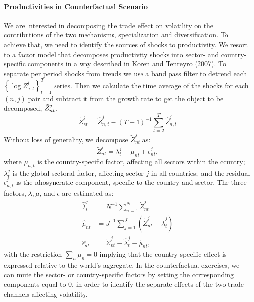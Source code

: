 \documentclass{article}
\begin{document}
\paragraph{Productivities in Counterfactual Scenario}

We are interested in decomposing the trade effect on volatility on the
contributions of the two mechanisms, specialization and diversification. To
achieve that, we need to identify the sources of shocks to productivity. We
resort to a factor model that decomposes productivity shocks into sector-
and country-specific components in a way described in Koren and Tenreyro
(2007). To separate per period shocks from trends we use a band pass filter
to detrend each $\left\{ \log {Z_{n,t}^{j}}\right\} _{t=1}^{T}$ series. Then
we calculate the time average of the shocks for each $(n,j)$ pair and
subtract it from the growth rate to get the object to be decomposed, $\tilde{%
Z}_{nt}^{j}$. 
\begin{equation*}
\tilde{Z}_{nt}^{j}=\hat{Z}_{n,t}^{j}-(T-1)^{-1}\sum_{t=2}^{T}\hat{Z}%
_{n,t}^{j} 
\end{equation*}%
Without loss of generality, we decompose $\tilde{Z}_{nt}^{j}$ as: 
\begin{equation*}
\tilde{Z}_{nt}^{j}=\lambda _{t}^{j}+\mu _{nt}+\epsilon _{nt}^{j}, 
\end{equation*}%
where ${\mu _{n,t}}$ is the country-specific factor, affecting all sectors
within the country; $\lambda _{t}^{j}$ is the global sectoral factor,
affecting sector $j$ in all countries;\ and the residual $\epsilon
_{n,t}^{j} $ is the idiosyncratic component, specific to the country and
sector. The three factors, $\lambda ,\mu $, and $\epsilon $ are estimated
as: 
\begin{align*}
\hat{\lambda}_{t}^{j}& =N^{-1}\sum_{n=1}^{N}\tilde{Z}_{nt}^{j} \\
\hat{\mu}_{nt}& =J^{-1}\sum_{j=1}^{J}\left( \tilde{Z}_{nt}^{j}-\hat{\lambda}%
_{t}^{j}\right) \\
\hat{\epsilon}_{nt}^{j}& =\tilde{Z}_{nt}^{j}-\hat{\lambda}_{t}^{j}-\hat{\mu}%
_{nt}\text{,}
\end{align*}%
with the restriction $\sum_{n}{\mu _{n}}=0$ implying that the
country-specific effect is expressed relative to the world's aggregate. In
the counterfactual exercises, we can mute the sector- or country-specific
factors by setting the corresponding components equal to 0, in order to
identify the separate effects of the two trade channels affecting volatility.
\end{document}
